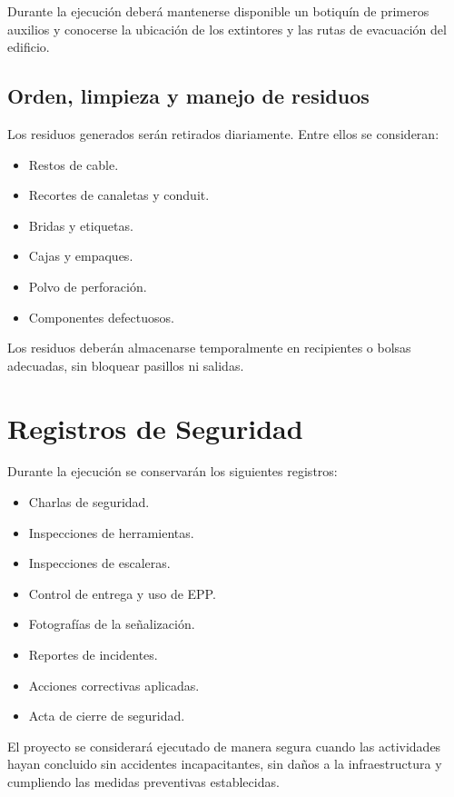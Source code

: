 Durante la ejecución deberá mantenerse disponible un botiquín de primeros auxilios y conocerse la ubicación de los extintores y las rutas de evacuación del edificio.

\subsection{Orden, limpieza y manejo de residuos}

Los residuos generados serán retirados diariamente. Entre ellos se consideran:

\begin{itemize}
    \item Restos de cable.
    \item Recortes de canaletas y conduit.
    \item Bridas y etiquetas.
    \item Cajas y empaques.
    \item Polvo de perforación.
    \item Componentes defectuosos.
\end{itemize}

Los residuos deberán almacenarse temporalmente en recipientes o bolsas adecuadas, sin bloquear pasillos ni salidas.

\section{Registros de Seguridad}

Durante la ejecución se conservarán los siguientes registros:

\begin{itemize}
    \item Charlas de seguridad.
    \item Inspecciones de herramientas.
    \item Inspecciones de escaleras.
    \item Control de entrega y uso de EPP.
    \item Fotografías de la señalización.
    \item Reportes de incidentes.
    \item Acciones correctivas aplicadas.
    \item Acta de cierre de seguridad.
\end{itemize}

El proyecto se considerará ejecutado de manera segura cuando las actividades hayan concluido sin accidentes incapacitantes, sin daños a la infraestructura y cumpliendo las medidas preventivas establecidas.

